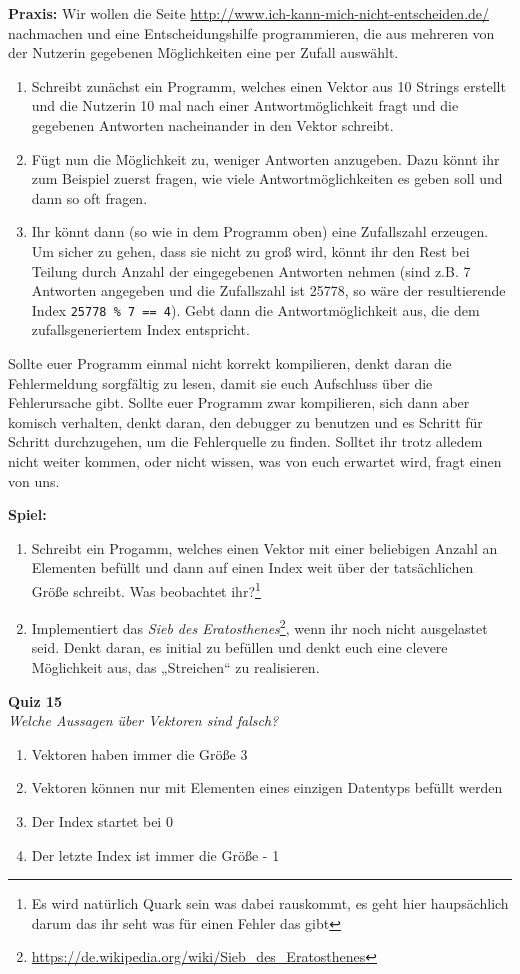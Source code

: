 \textbf{Praxis:}
Wir wollen die Seite \url{http://www.ich-kann-mich-nicht-entscheiden.de/} nachmachen und eine Entscheidungshilfe programmieren, die aus mehreren von der Nutzerin gegebenen Möglichkeiten eine per Zufall auswählt.

\begin{enumerate}
	\item
		Schreibt zunächst ein Programm, welches einen Vektor aus 10 Strings erstellt und die Nutzerin 10 mal nach einer Antwortmöglichkeit fragt und die gegebenen Antworten nacheinander in den Vektor schreibt.
	\item
		Fügt nun die Möglichkeit zu, weniger Antworten anzugeben.
		Dazu könnt ihr zum Beispiel zuerst fragen, wie viele Antwortmöglichkeiten es geben soll und dann so oft fragen.
	\item
		Ihr könnt dann (so wie in dem Programm oben) eine Zufallszahl erzeugen.
		Um sicher zu gehen, dass sie nicht zu groß wird, könnt ihr den Rest bei Teilung durch Anzahl der eingegebenen Antworten nehmen (sind z.B. 7 Antworten angegeben und die Zufallszahl ist 25778, so wäre der resultierende Index \texttt{25778 \% 7 == 4}).
		Gebt dann die Antwortmöglichkeit aus, die dem zufallsgeneriertem Index entspricht.
\end{enumerate}

Sollte euer Programm einmal nicht korrekt kompilieren, denkt daran die Fehlermeldung sorgfältig zu lesen, damit sie euch Aufschluss über die Fehlerursache gibt.
Sollte euer Programm zwar kompilieren, sich dann aber komisch verhalten, denkt daran, den debugger zu benutzen und es Schritt für Schritt durchzugehen, um die Fehlerquelle zu finden. Solltet ihr trotz alledem nicht weiter kommen, oder nicht wissen, was von euch erwartet wird, fragt einen
von uns.

\textbf{Spiel:}
\begin{enumerate}
	\item
		Schreibt ein Progamm, welches einen Vektor mit einer beliebigen Anzahl an Elementen befüllt und dann auf einen Index weit über der tatsächlichen Größe schreibt.
		Was beobachtet ihr?\footnote{Es wird natürlich Quark sein was dabei rauskommt, es geht hier haupsächlich darum das ihr seht was für einen Fehler das gibt}
	\item
		Implementiert das \emph{Sieb des Eratosthenes}\footnote{\url{https://de.wikipedia.org/wiki/Sieb_des_Eratosthenes}}, wenn ihr noch nicht ausgelastet seid.
		Denkt daran, es initial zu befüllen und denkt euch eine clevere Möglichkeit aus, das „Streichen“ zu realisieren.
\end{enumerate}

\textbf{Quiz 15}\\
\textit{Welche Aussagen über Vektoren sind falsch?}
\begin{enumerate}[label=\alph]
    \item Vektoren haben immer die Größe 3
    \item Vektoren können nur mit Elementen eines einzigen Datentyps befüllt werden
    \item Der Index startet bei 0
    \item Der letzte Index ist immer die Größe - 1
\end{enumerate}
